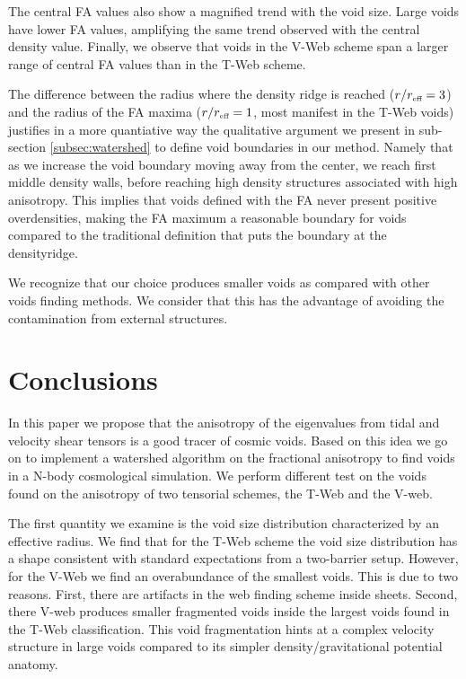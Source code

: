 \documentclass[a4,useAMS,usenatbib,usegraphicx]{mn2e}
\newcommand{\reff}{{\ifmmode{r_{\mbox{\tiny eff}}}\else{$r_{\mbox{\tiny eff}}$}\fi}}
\begin{document}
The central FA values also show a magnified trend with the void size. 
Large voids have lower FA values, amplifying the same trend
observed with the central density value. 
Finally, we observe that voids in the V-Web scheme span a larger range
of central FA values than in the T-Web scheme.  

The difference between the radius where the density ridge is reached 
($r/\reff =3$) and the radius of the FA maxima ($r/\reff =1$, most
manifest in the T-Web voids) justifies in a more quantiative way the
qualitative argument we present in sub-section \ref{subsec:watershed}
to define void boundaries in our method.  
Namely that as we increase the void boundary moving away from the
center, we reach first middle density walls, before reaching high
density structures associated with high anisotropy.  
This implies that voids defined with the FA never present positive
overdensities, making the FA maximum a reasonable boundary for voids
compared to the traditional definition that puts the boundary at the
densityridge.     

We recognize that our choice produces smaller voids as compared with
other voids finding methods. 
We consider that this has the advantage of
avoiding the contamination from external structures.


\section{Conclusions}
\label{sec:conclusions}

In this paper we propose that the anisotropy of the eigenvalues from
tidal and velocity shear tensors is a good tracer of  cosmic voids. 
Based on this idea we go on to implement a watershed
algorithm on the fractional anisotropy to find voids in a N-body
cosmological simulation.
We perform different test on the voids found on the anisotropy of two
tensorial schemes, the T-Web and the V-web.  

The first quantity we examine is the void size distribution
characterized by an effective radius. 
We find that for the T-Web scheme the void size distribution has a
shape consistent with standard expectations from a two-barrier setup. 
However, for the V-Web we find an overabundance of the smallest voids.
This is due to two reasons. 
First, there are artifacts in the web
finding scheme inside sheets. 
Second, there V-web produces smaller
fragmented voids inside the largest voids found in the T-Web
classification.  
This void fragmentation hints at a complex velocity structure in large
voids compared to its simpler density/gravitational potential anatomy.  
\end{document}
